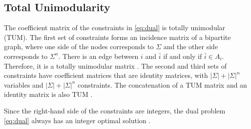 \documentclass{article}
\makeatletter
\newcommand{\myvspace}{\@ifstar\myvspacestar\myvspacenostar}
\newcommand{\myvspacenostar}[1]{}
\newcommand{\myvspacestar}[1]{}
\newcommand{\crvspace}{\@ifstar\crvspacestar\crvspacenostar}
\newcommand{\crvspacenostar}[1]{}
\newcommand{\crvspacestar}[1]{}
\makeatother
\begin{document}
\subsection{Total Unimodularity}
\myvspace{-4pt}
\crvspace{-4pt}
The coefficient matrix of the constraints in \eqref{eq:dual} is totally unimodular (TUM). The first set of constraints forms an incidence matrix of a bipartite graph, where one side of the nodes corresponds to $\Sigma$ and the other side corresponds to $\Sigma^n$. There is an edge between $i$ and $\bar{i}$ if and only if $\bar{i}\in A_i$. Therefore, it is a totally unimodular matrix \citep{biggs1993algebraic}. The second and third sets of constraints have coefficient matrices that are identity matrices, with $|\Sigma|+|\Sigma|^n$ variables and $|\Sigma|+|\Sigma|^n$ constraints. The concatenation of a TUM matrix and an identity matrix is also TUM \citep{commoner1973sufficient}.

Since the right-hand side of the constraints are integers, the dual problem \eqref{eq:dual} always has an integer optimal solution \citep{hoffman2010integral}.

\myvspace{-5pt}
\crvspace{-5pt}
\end{document}
